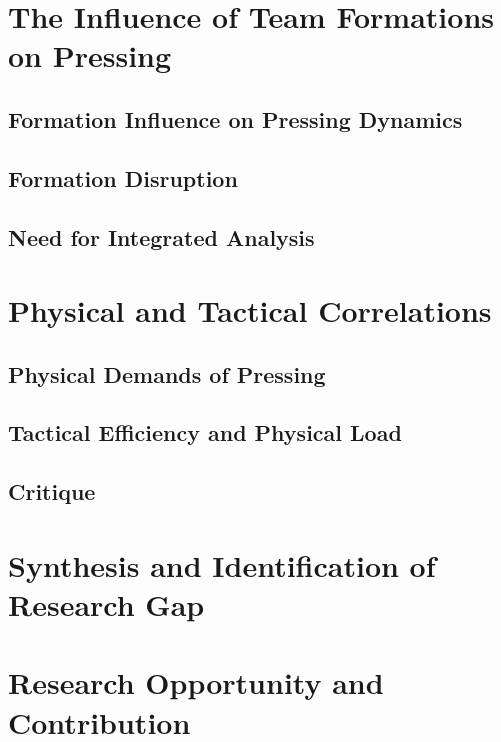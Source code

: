 \section{The Influence of Team Formations on Pressing}


\subsection{Formation Influence on Pressing Dynamics}


\subsection{Formation Disruption}


\subsection{Need for Integrated Analysis}


\section{Physical and Tactical Correlations}


\subsection{Physical Demands of Pressing}


\subsection{Tactical Efficiency and Physical Load}


\subsection{Critique}



\section{Synthesis and Identification of Research Gap}





\section{Research Opportunity and Contribution}